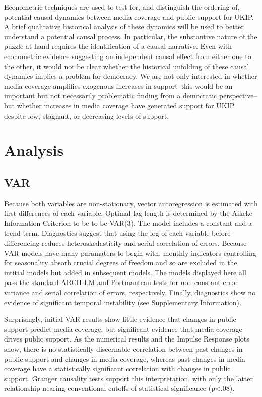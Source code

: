 \documentclass[12pt,article]{article}
\begin{document}
Econometric techniques are used to test for, and distinguish the
ordering of, potential causal dynamics between media coverage and public
support for UKIP. A brief qualitative historical analysis of these
dynamics will be used to better understand a potential causal process.
In particular, the substantive nature of the puzzle at hand requires the
identification of a causal narrative. Even with econometric evidence
suggesting an independent causal effect from either one to the other, it
would not be clear whether the historical unfolding of these causal
dynamics implies a problem for democracy. We are not only interested in
whether media coverage amplifies exogenous increases in support--this
would be an important but not necessarily problematic finding from a
democratic perspective--but whether increases in media coverage have
generated support for UKIP despite low, stagnant, or decreasing levels
of support.

\section{Analysis}\label{analysis}

\subsection{VAR}\label{var}

Because both variables are non-stationary, vector autoregression is
estimated with first differences of each variable. Optimal lag length is
determined by the Aikeke Information Criterion to be to be VAR(3). The
model includes a constant and a trend term. Diagnostics suggest that
using the log of each variable before differencing reduces
heteroskedasticity and serial correlation of errors. Because VAR models
have many paramaters to begin with, monthly indicators controlling for
seasonality absorb crucial degrees of freedom and so are excluded in the
intitial models but added in subsequent models. The models displayed
here all pass the standard ARCH-LM and Portmanteau tests for
non-constant error variance and serial correlation of errors,
respectively. Finally, diagnostics show no evidence of significant
temporal instability (see Supplementary Information).

Surprisingly, initial VAR results show little evidence that changes in
public support predict media coverage, but significant evidence that
media coverage drives public support. As the numerical results and the
Impulse Response plots show, there is no statistically discernable
correlation between past changes in public support and changes in media
coverage, whereas past changes in media coverage have a statistically
significant correlation with changes in public support. Granger
causality tests support this interpretation, with only the latter
relationship nearing conventional cutoffs of statistical significance
(p\textless{}.08).
\end{document}
